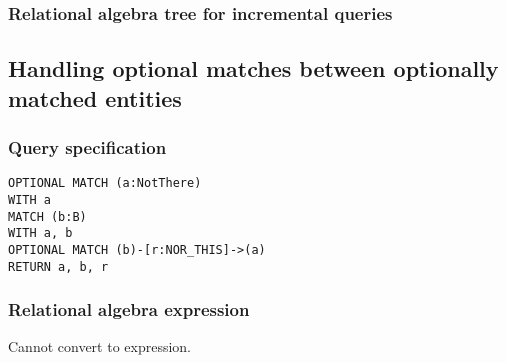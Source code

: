 \subsubsection*{Relational algebra tree for incremental queries}


\subsection{Handling optional matches between optionally matched entities}

\subsubsection*{Query specification}

\begin{lstlisting}
OPTIONAL MATCH (a:NotThere)
WITH a
MATCH (b:B)
WITH a, b
OPTIONAL MATCH (b)-[r:NOR_THIS]->(a)
RETURN a, b, r
\end{lstlisting}

\subsubsection*{Relational algebra expression}

Cannot convert to expression.

